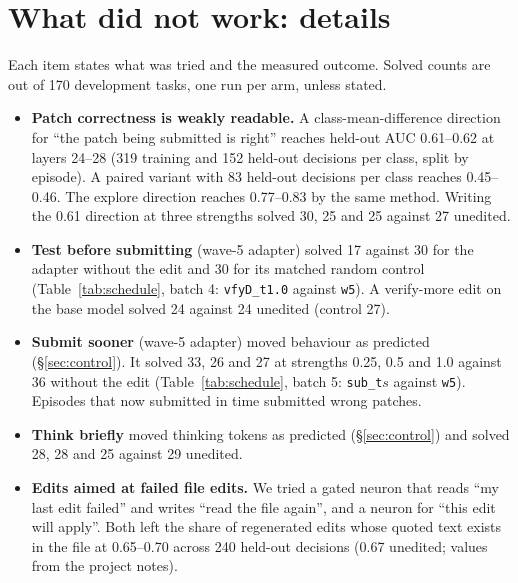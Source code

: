 \section{What did not work: details}
\label{app:negative}
Each item states what was tried and the measured outcome. Solved counts are out of 170 development tasks, one run per arm, unless stated.

\begin{itemize}
    \item \textbf{Patch correctness is weakly readable.} A class-mean-difference direction for ``the patch being submitted is right'' reaches held-out AUC 0.61--0.62 at layers 24--28 (319 training and 152 held-out decisions per class, split by episode). A paired variant with 83 held-out decisions per class reaches 0.45--0.46. The explore direction reaches 0.77--0.83 by the same method. Writing the 0.61 direction at three strengths solved 30, 25 and 25 against 27 unedited.
    \item \textbf{Test before submitting} (wave-5 adapter) solved 17 against 30 for the adapter without the edit and 30 for its matched random control (Table~\ref{tab:schedule}, batch 4: \texttt{vfyD\_t1.0} against \texttt{w5}). A verify-more edit on the base model solved 24 against 24 unedited (control 27).
    \item \textbf{Submit sooner} (wave-5 adapter) moved behaviour as predicted (\S\ref{sec:control}). It solved 33, 26 and 27 at strengths 0.25, 0.5 and 1.0 against 36 without the edit (Table~\ref{tab:schedule}, batch 5: \texttt{sub\_t}$s$ against \texttt{w5}). Episodes that now submitted in time submitted wrong patches.
    \item \textbf{Think briefly} moved thinking tokens as predicted (\S\ref{sec:control}) and solved 28, 28 and 25 against 29 unedited.
    \item \textbf{Edits aimed at failed file edits.} We tried a gated neuron that reads ``my last edit failed'' and writes ``read the file again'', and a neuron for ``this edit will apply''. Both left the share of regenerated edits whose quoted text exists in the file at 0.65--0.70 across 240 held-out decisions (0.67 unedited; values from the project notes).

\end{itemize}

